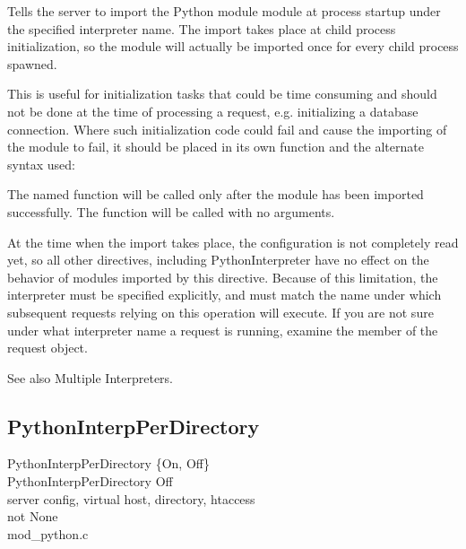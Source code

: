 Tells the server to import the Python module module at process startup
under the specified interpreter name. The import takes place at child
process initialization, so the module will actually be imported once for
every child process spawned.

This is useful for initialization tasks that could be time consuming and
should not be done at the time of processing a request, e.g. initializing a
database connection. Where such initialization code could fail and cause
the importing of the module to fail, it should be placed in its own function
and the alternate syntax used:


The named function will be called only after the module has been imported
successfully. The function will be called with no arguments.

\begin{notice}
  At the time when the import takes place, the configuration is not
  completely read yet, so all other directives, including
  PythonInterpreter have no effect on the behavior of modules imported
  by this directive. Because of this limitation, the interpreter must
  be specified explicitly, and must match the name under which
  subsequent requests relying on this operation will execute. If you
  are not sure under what interpreter name a request is running,
  examine the  member of the request object.
\end{notice}

See also Multiple Interpreters. 

\subsection{PythonInterpPerDirectory\label{dir-other-ipd}}

PythonInterpPerDirectory \{On, Off\} \\
PythonInterpPerDirectory Off\\
server config, virtual host, directory, htaccess\\
not None\\
mod_python.c

